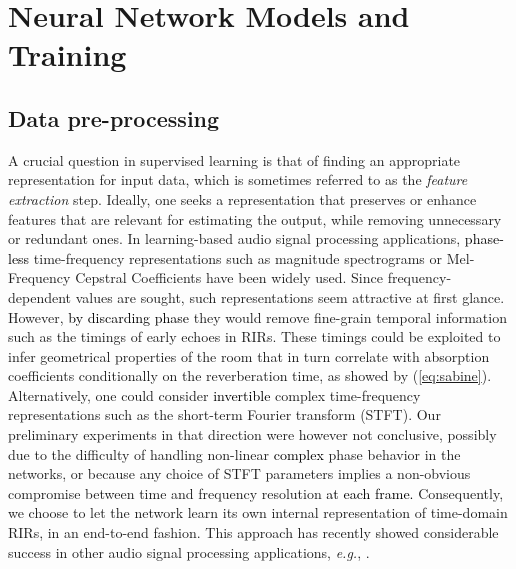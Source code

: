 \documentclass[reprint]{JASA}
\begin{document}
\section{Neural Network Models and Training}
\label{sec:training} 
\subsection{Data pre-processing}
\label{subsec:pre-proc}
A crucial question in supervised learning is that of finding an appropriate representation for input data, which is sometimes referred to as the \textit{feature extraction} step. Ideally, one seeks a representation that preserves or enhance features that are relevant for estimating the output, while removing unnecessary or redundant ones. In learning-based audio signal processing applications, \textcolor{black}{phase-less} time-frequency representations such as magnitude spectrograms or Mel-Frequency Cepstral Coefficients have been widely used. Since frequency-dependent values are sought, such representations seem attractive at first glance. However, \textcolor{black}{by discarding phase} they would remove fine-grain temporal information such as the timings of early echoes in RIRs. These timings could be exploited to infer geometrical properties of the room that in turn correlate with absorption coefficients conditionally on the reverberation time, as showed by (\ref{eq:sabine}). Alternatively, one could consider \textcolor{black}{invertible} complex time-frequency representations such as the short-term Fourier transform (STFT). Our preliminary experiments in that direction were however not conclusive, possibly due to the difficulty of handling non-linear \textcolor{black}{complex} phase behavior in the networks, or because any choice of STFT parameters implies a non-obvious compromise between time and frequency resolution \textcolor{black}{at each frame.}
Consequently, we choose to let the network learn its own internal representation of time-domain RIRs, in an end-to-end fashion. This approach has recently showed considerable success in other audio signal processing applications, \textit{e.g.}, \cite{luo2018tasnet}.
\end{document}
